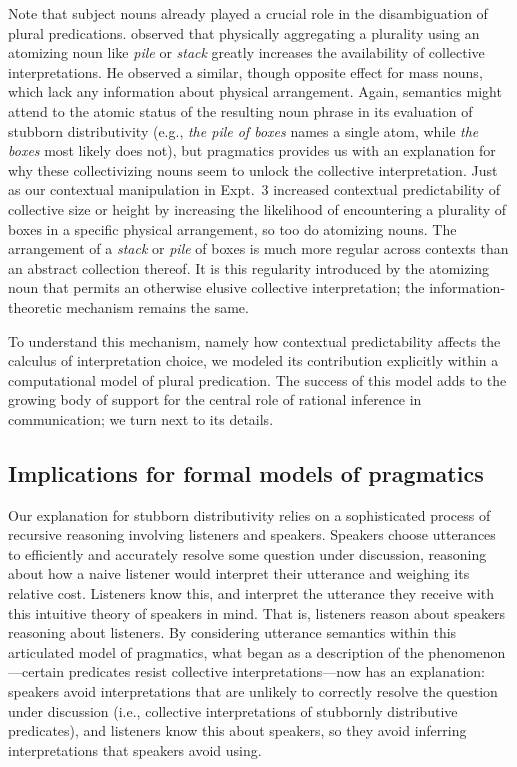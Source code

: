 \documentclass[linguex]{sp}
\begin{document}
Note that subject nouns already played a crucial role in the disambiguation of plural predications. \cite{schwarzschild2011} observed that physically aggregating a plurality using an atomizing noun like \emph{pile} or \emph{stack} greatly increases the availability of collective interpretations. He observed a similar, though opposite effect for mass nouns, which lack any information about physical arrangement. Again, semantics might attend to the atomic status of the resulting noun phrase in its evaluation of stubborn distributivity (e.g., \emph{the pile of boxes} names a single atom, while \emph{the boxes} most likely does not), but pragmatics provides us with an explanation for why these collectivizing nouns seem to unlock the collective interpretation. Just as our contextual manipulation in Expt.~3 increased contextual predictability of collective size or height by increasing the likelihood of encountering a plurality of boxes in a specific physical arrangement, so too do atomizing nouns. The arrangement of a \emph{stack} or \emph{pile} of boxes is much more regular across contexts than an abstract collection thereof. It is this regularity introduced by the atomizing noun that permits an otherwise elusive collective interpretation; the information-theoretic mechanism remains the same.

To understand this mechanism, namely how contextual predictability affects the calculus of interpretation choice, we modeled its contribution explicitly within a computational model of plural predication. The success of this model adds to the growing body of support for the central role of rational inference in communication; we turn next to its details.

\subsection{Implications for formal models of pragmatics}

Our explanation for stubborn distributivity relies on a sophisticated process of recursive reasoning involving listeners and speakers. Speakers choose utterances to efficiently and accurately resolve some question under discussion, reasoning about how a naive listener would interpret their utterance and weighing its relative cost. Listeners know this, and interpret the utterance they receive with this intuitive theory of speakers in mind. That is, listeners reason about speakers reasoning about listeners. By considering utterance semantics within this articulated model of pragmatics, what began as a description of the phenomenon---certain predicates resist collective interpretations---now has an explanation: speakers avoid interpretations that are unlikely to correctly resolve the question under discussion (i.e., collective interpretations of stubbornly distributive predicates), and listeners know this about speakers, so they avoid inferring interpretations that speakers avoid using.
\end{document}
